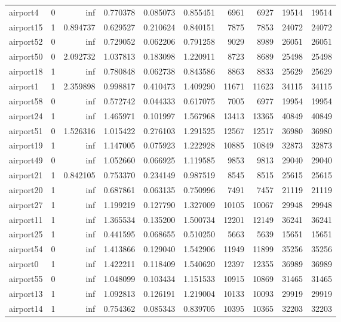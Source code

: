 \begin{longtable}{|l|r|r|r|r|r|r|r|r|r|}
airport4 & 0 & inf & 0.770378 & 0.085073 & 0.855451 & 6961 & 6927 & 19514 & 19514 \\
airport15 & 1 & 0.894737 & 0.629527 & 0.210624 & 0.840151 & 7875 & 7853 & 24072 & 24072 \\
airport52 & 0 & inf & 0.729052 & 0.062206 & 0.791258 & 9029 & 8989 & 26051 & 26051 \\
airport50 & 0 & 2.092732 & 1.037813 & 0.183098 & 1.220911 & 8723 & 8689 & 25498 & 25498 \\
airport18 & 1 & inf & 0.780848 & 0.062738 & 0.843586 & 8863 & 8833 & 25629 & 25629 \\
airport1 & 1 & 2.359898 & 0.998817 & 0.410473 & 1.409290 & 11671 & 11623 & 34115 & 34115 \\
airport58 & 0 & inf & 0.572742 & 0.044333 & 0.617075 & 7005 & 6977 & 19954 & 19954 \\
airport24 & 1 & inf & 1.465971 & 0.101997 & 1.567968 & 13413 & 13365 & 40849 & 40849 \\
airport51 & 0 & 1.526316 & 1.015422 & 0.276103 & 1.291525 & 12567 & 12517 & 36980 & 36980 \\
airport19 & 1 & inf & 1.147005 & 0.075923 & 1.222928 & 10885 & 10849 & 32873 & 32873 \\
airport49 & 0 & inf & 1.052660 & 0.066925 & 1.119585 & 9853 & 9813 & 29040 & 29040 \\
airport21 & 1 & 0.842105 & 0.753370 & 0.234149 & 0.987519 & 8545 & 8515 & 25615 & 25615 \\
airport20 & 1 & inf & 0.687861 & 0.063135 & 0.750996 & 7491 & 7457 & 21119 & 21119 \\
airport27 & 1 & inf & 1.199219 & 0.127790 & 1.327009 & 10105 & 10067 & 29948 & 29948 \\
airport11 & 1 & inf & 1.365534 & 0.135200 & 1.500734 & 12201 & 12149 & 36241 & 36241 \\
airport25 & 1 & inf & 0.441595 & 0.068655 & 0.510250 & 5663 & 5639 & 15651 & 15651 \\
airport54 & 0 & inf & 1.413866 & 0.129040 & 1.542906 & 11949 & 11899 & 35256 & 35256 \\
airport0 & 1 & inf & 1.422211 & 0.118409 & 1.540620 & 12397 & 12355 & 36989 & 36989 \\
airport55 & 0 & inf & 1.048099 & 0.103434 & 1.151533 & 10915 & 10869 & 31465 & 31465 \\
airport13 & 1 & inf & 1.092813 & 0.126191 & 1.219004 & 10133 & 10093 & 29919 & 29919 \\
airport14 & 1 & inf & 0.754362 & 0.085343 & 0.839705 & 10395 & 10365 & 32203 & 32203 \\

\end{longtable}
